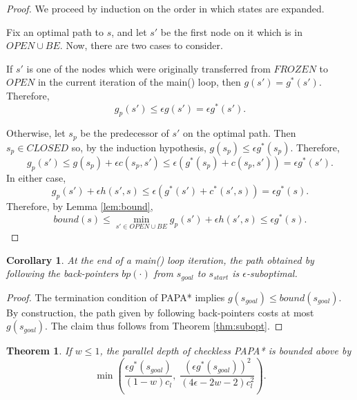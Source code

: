 \documentclass[letterpaper]{article}
\newtheorem{thm}{Theorem}
\newtheorem{cor}{Corollary}
\begin{document}
\begin{proof}
We proceed by induction on the order in which states are expanded.

Fix an optimal path to $s$, and let $s'$ be the first node on it which is in $OPEN \cup BE$. Now, there are two cases to consider.

If $s'$ is one of the nodes which were originally transferred from $FROZEN$ to $OPEN$ in the current iteration of the main() loop, then $g(s') = g^*(s')$. Therefore,
\[g_p(s') \le \epsilon g(s') = \epsilon g^*(s').\]

Otherwise, let $s_p$ be the predecessor of $s'$ on the optimal path. Then $s_p \in CLOSED$ so, by the induction hypothesis, $g(s_p) \le \epsilon g^*(s_p)$. Therefore,
\[g_p(s') \le g(s_p) + \epsilon c(s_p,s') \le \epsilon(g^*(s_p) + c(s_p,s')) = \epsilon g^*(s').\]
In either case,
\[g_p(s') + \epsilon h(s',s) \le \epsilon\left(g^*(s') + c^*(s',s)\right) = \epsilon g^*(s).\]
Therefore, by Lemma \ref{lem:bound},
\[bound(s) \le \min_{s' \in OPEN \cup BE} g_p(s') + \epsilon h(s',s) \le \epsilon g^*(s).\]
\end{proof}

\begin{cor}
\label{cor:subopt}
At the end of a main() loop iteration, the path obtained by following the back-pointers $bp(\cdot)$ from $s_{goal}$ to $s_{start}$ is $\epsilon$-suboptimal.
\end{cor}

\begin{proof}
The termination condition of PAPA* implies $g(s_{goal}) \le bound(s_{goal})$. By construction, the path given by following back-pointers costs at most $g(s_{goal})$. The claim thus follows from Theorem \ref{thm:subopt}.
\end{proof}

\begin{thm}
\label{thm:depth}
If $w \le 1$, the parallel depth of checkless PAPA* is bounded above by
\[\min\left(\frac{\epsilon g^*(s_{goal})}{(1-w)c_l},\;
\frac{\left(\epsilon g^*(s_{goal})\right)^2 }{(4\epsilon-2w-2)c_l^2}\right).\]
\end{thm}
\end{document}
